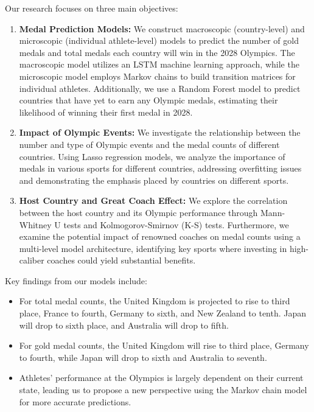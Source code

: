 \documentclass[12pt]{article}
\begin{document}
Our research focuses on three main objectives:
\begin{enumerate}
    \item \textbf{Medal Prediction Models:} We construct macroscopic (country-level) and microscopic (individual athlete-level) models to predict the number of gold medals and total medals each country will win in the 2028 Olympics. The macroscopic model utilizes an LSTM machine learning approach, while the microscopic model employs Markov chains to build transition matrices for individual athletes. Additionally, we use a Random Forest model to predict countries that have yet to earn any Olympic medals, estimating their likelihood of winning their first medal in 2028.
    
    \item \textbf{Impact of Olympic Events:} We investigate the relationship between the number and type of Olympic events and the medal counts of different countries. Using Lasso regression models, we analyze the importance of medals in various sports for different countries, addressing overfitting issues and demonstrating the emphasis placed by countries on different sports.
    
    \item \textbf{Host Country and Great Coach Effect:} We explore the correlation between the host country and its Olympic performance through Mann-Whitney U tests and Kolmogorov-Smirnov (K-S) tests. Furthermore, we examine the potential impact of renowned coaches on medal counts using a multi-level model architecture, identifying key sports where investing in high-caliber coaches could yield substantial benefits.
\end{enumerate}

Key findings from our models include:
\begin{itemize}
    \item For total medal counts, the United Kingdom is projected to rise to third place, France to fourth, Germany to sixth, and New Zealand to tenth. Japan will drop to sixth place, and Australia will drop to fifth.
    \item For gold medal counts, the United Kingdom will rise to third place, Germany to fourth, while Japan will drop to sixth and Australia to seventh.
    \item Athletes' performance at the Olympics is largely dependent on their current state, leading us to propose a new perspective using the Markov chain model for more accurate predictions.
\end{itemize}
\end{document}
